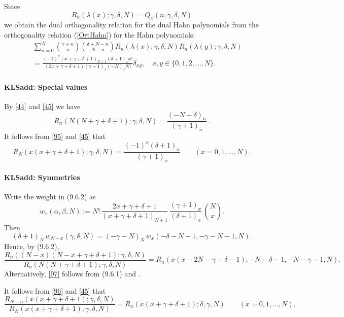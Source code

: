 \documentclass[envcountchap,graybox]{svmono}
\newcounter{rom}
\newcommand\al\alpha
\newcommand\be\beta
\newcommand\ga\gamma
\newcommand\de\delta
\begin{document}
\noindent
Since
$$R_n(\lambda(x);\gamma,\delta,N)=Q_x(n;\gamma,\delta,N)$$
we obtain the dual orthogonality relation for the dual Hahn polynomials
from the orthogonality relation (\ref{OrtHahn}) for the Hahn polynomials:
\begin{eqnarray*}
& &\sum_{n=0}^N\binom{\gamma+n}{n}\binom{\delta+N-n}{N-n} R_n(\lambda(x);\gamma,\delta,N)R_n(\lambda(y);\gamma,\delta,N)\\
& &{}=\frac{(-1)^x(x+\gamma+\delta+1)_{N+1}(\delta+1)_xx!}
{(2x+\gamma+\delta+1)(\gamma+1)_x(-N)_xN!}\delta_{xy},\quad x,y \in \{0,1,2,\ldots,N\}.
\end{eqnarray*}
%
\paragraph{\large\bf KLSadd: Special values}By \eqref{44} and \eqref{45} we have
\begin{equation}
R_n(N(N+\ga+\de+1);\ga,\de,N)=\frac{(-N-\de)_n}{(\ga+1)_n}\,.
\label{47}
\end{equation}
It follows from \eqref{95} and \eqref{45} that
\begin{equation}
R_N(x(x+\ga+\de+1);\ga,\de,N)
=\frac{(-1)^x(\de+1)_x}{(\ga+1)_x}\qquad(x=0,1,\ldots,N).
\label{101}
\end{equation}
%
\paragraph{\large\bf KLSadd: Symmetries}Write the weight in (9.6.2) as
\begin{equation}
w_x(\al,\be,N):=N!\,\frac{2x+\ga+\de+1}{(x+\ga+\de+1)_{N+1}}\,
\frac{(\ga+1)_x}{(\de+1)_x}\,\binom Nx.
\label{98}
\end{equation}
Then
\begin{equation}
(\de+1)_N\,w_{N-x}(\ga,\de,N)=
(-\ga-N)_N\,w_x(-\de-N-1,-\ga-N-1,N).
\label{99}
\end{equation}
Hence, by (9.6.2),
\begin{equation}
\frac{R_n((N-x)(N-x+\ga+\de+1);\ga,\de,N)}{R_n(N(N+\ga+\de+1);\ga,\de,N)}
=R_n(x(x-2N-\ga-\de-1);-N-\de-1,-N-\ga-1,N).
\label{97}
\end{equation}
Alternatively, \eqref{97} follows from (9.6.1) and
.

It follows from \eqref{96} and \eqref{45} that
\begin{equation}
\frac{R_{N-n}(x(x+\ga+\de+1);\ga,\de,N)}
{R_N(x(x+\ga+\de+1);\ga,\de,N)}
=R_n(x(x+\ga+\de+1);\de,\ga,N)\qquad(x=0,1,\ldots,N).
\label{102}
\end{equation}
%
\end{document}
